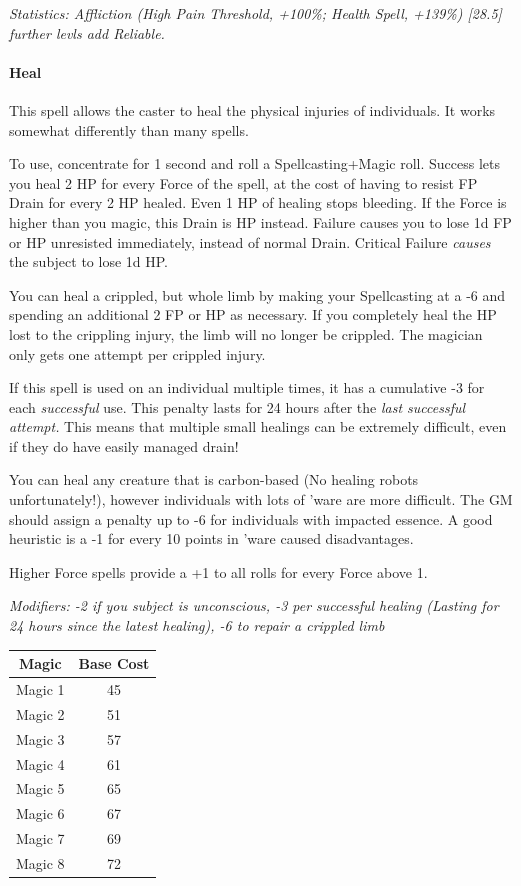 \begin{multicols*}{3}
	\textcolor{OliveGreen}{\textit{Statistics: Affliction (High Pain Threshold, +100\%; Health Spell, +139\%) [28.5] further levls add Reliable. }}
	
	\paragraph{Heal}
	
	This spell allows the caster to heal the physical injuries of individuals. It works somewhat differently than many spells.
	
	To use, concentrate for 1 second and roll a Spellcasting+Magic roll. Success lets you heal 2 HP for every Force of the spell, at the cost of having to resist FP Drain for every 2 HP healed. Even 1 HP of healing stops bleeding. If the Force is higher than you magic, this Drain is HP instead. Failure causes you to lose 1d FP or HP unresisted immediately, instead of normal Drain. Critical Failure \textit{causes} the subject to lose 1d HP.
	
	You can heal a crippled, but whole limb by making your Spellcasting at a -6 and spending an additional 2 FP or HP as necessary. If you completely heal the HP lost to the crippling injury, the limb will no longer be crippled. The magician only gets one attempt per crippled injury.
	
	If this spell is used on an individual multiple times, it has a cumulative -3 for each \textit{successful} use. This penalty lasts for 24 hours after the \textit{last successful attempt.} This means that multiple small healings can be extremely difficult, even if they do have easily managed drain!
	
	You can heal any creature that is carbon-based (No healing robots unfortunately!), however individuals with lots of 'ware are more difficult. The GM should assign a penalty up to -6 for individuals with impacted essence. A good heuristic is a -1 for every 10 points in 'ware caused disadvantages.
	
	Higher Force spells provide a +1 to all rolls for every Force above 1.
	
	\textcolor{NavyBlue}{\textit{Modifiers: -2 if you subject is unconscious, -3 per successful healing (Lasting for 24 hours since the latest healing), -6 to repair a crippled limb}}
		 
	\begin{center}
		\begin{tabular}{|c|c|}
			\hline
			Magic & Base Cost \\
			\hline
			\hline
			Magic 1 & 45 \\
			Magic 2 & 51 \\
			Magic 3 & 57 \\
			Magic 4 & 61 \\
			Magic 5 & 65 \\
			Magic 6 & 67 \\
			Magic 7 & 69 \\
			Magic 8 & 72 \\
			\hline
		\end{tabular}
	\end{center}
	

\end{multicols*}
